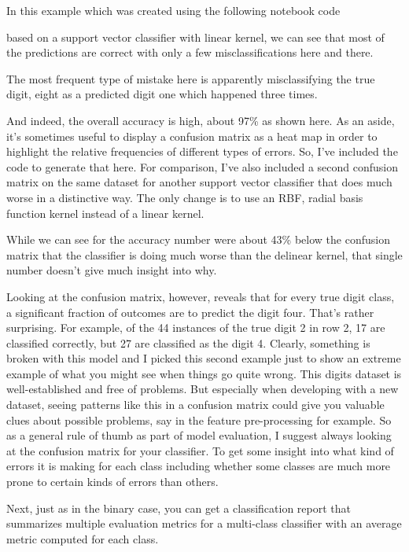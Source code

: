 \begin{multicols}{2}
In this example which was created using the following notebook code 

based on a support vector classifier with linear kernel, we can see that most of the predictions are correct with only a few misclassifications here and there. 

The most frequent type of mistake here is apparently misclassifying the true digit, eight as a predicted digit one which happened three times. 

And indeed, the overall accuracy is high, about 97\% as shown here. As an aside, it's sometimes useful to display a confusion matrix as a heat map in order to highlight the relative frequencies of different types of errors. So, I've included the code to generate that here. For comparison, I've also included a second confusion matrix on the same dataset for another support vector classifier that does much worse in a distinctive way. The only change is to use an RBF, radial basis function kernel instead of a linear kernel. 

While we can see for the accuracy number were about 43\% below the confusion matrix that the classifier is doing much worse than the delinear kernel, that single number doesn't give much insight into why. 

Looking at the confusion matrix, however, reveals that for every true digit class, a significant fraction of outcomes are to predict the digit four. That's rather surprising. For example, of the 44 instances of the true digit 2 in row 2, 17 are classified correctly, but 27 are classified as the digit 4. Clearly, something is broken with this model and I picked this second example just to show an extreme example of what you might see when things go quite wrong. This digits dataset is well-established and free of problems. But especially when developing with a new dataset, seeing patterns like this in a confusion matrix could give you valuable clues about possible problems, say in the feature pre-processing for example. So as a general rule of thumb as part of model evaluation, I suggest always looking at the confusion matrix for your classifier. To get some insight into what kind of errors it is making for each class including whether some classes are much more prone to certain kinds of errors than others. 

Next, just as in the binary case, you can get a classification report that summarizes multiple evaluation metrics for a multi-class classifier with an average metric computed for each class. 


\end{multicols}
